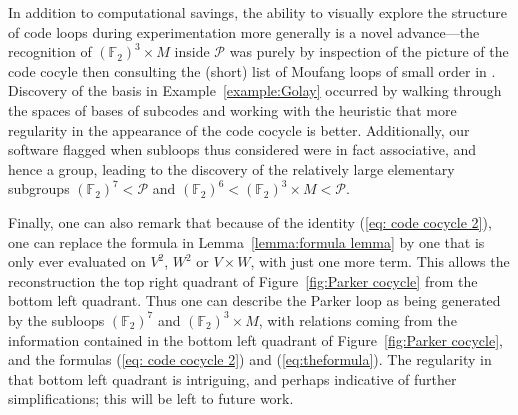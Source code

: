\documentclass{article}
\theoremstyle{plain}
\theoremstyle{definition}
\def \cP {\mathcal{P}}
\def \FF {\mathbb{F}}
\begin{document}
In addition to computational savings, the ability to visually explore the structure of code loops during experimentation more generally is a novel advance---the recognition of $(\FF_2)^3\times M$ inside $\cP$ was purely by inspection of the picture of the code cocyle then consulting the (short) list of Moufang loops of small order in \cite{Chein}.
Discovery of the basis in Example~\ref{example:Golay} occurred by walking through the spaces of bases of subcodes and working with the heuristic that more regularity in the appearance of the code cocycle is better.
Additionally, our software flagged when subloops thus considered were in fact associative, and hence a group, leading to the discovery of the relatively large elementary subgroups $(\FF_2)^7 < \cP$ and $(\FF_2)^6 < (\FF_2)^3\times M < \cP$. 

Finally, one can also remark that because of the identity (\ref{eq: code cocycle 2}), one can replace the formula in Lemma~\ref{lemma:formula lemma} by one that is only ever evaluated on $V^2$, $W^2$ or $V\times W$, with just one more term. This allows the reconstruction the top right quadrant of Figure~\ref{fig:Parker cocycle} from the bottom left quadrant. 
Thus one can describe the Parker loop as being generated by the subloops $(\FF_2)^7$ and $(\FF_2)^3\times M$, with relations coming from the information contained in the bottom left quadrant of Figure~\ref{fig:Parker cocycle}, and the formulas (\ref{eq: code cocycle 2}) and (\ref{eq:theformula}).
The regularity in that bottom left quadrant is intriguing, and perhaps indicative of further simplifications; this will be left to future work.

\newpage
\end{document}
